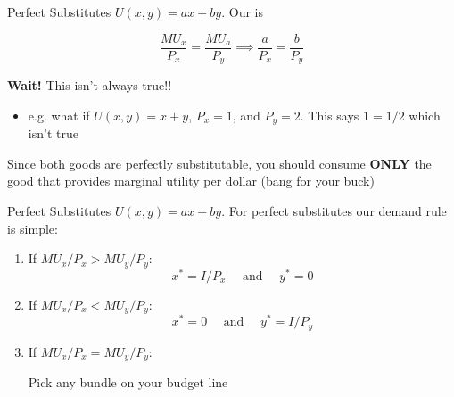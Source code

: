 \documentclass[12pt,t]{beamer}
\begin{document}
\begin{frame}{Perfect Substitutes}
  $U(x,y) = ax + by$. Our  is

  $$
    \frac{MU_x}{P_x} = \frac{MU_a}{P_y} \implies \frac{a}{P_x} = \frac{b}{P_y}
  $$

  \pause\bigskip
  \textbf{Wait!} This isn't always true!!
  \begin{itemize}
    \item e.g. what if $U(x,y) = x + y$, $P_x = 1$, and $P_y = 2$. This says $1 = 1/2$ which isn't true
  \end{itemize} 

  \pause\bigskip
  Since both goods are perfectly substitutable, you should consume \textbf{ONLY} the good that provides marginal utility per dollar (bang for your buck)
\end{frame}

\begin{frame}{Perfect Substitutes}
  $U(x,y) = ax + by$. For perfect substitutes our demand rule is simple: 
  
  \bigskip
  \begin{enumerate}
    \item If $MU_x/P_x > MU_y / P_y$: 
    $$
      x^* = I / P_x \quad\text{ and }\quad y^* = 0
    $$

    \item If $MU_x/P_x < MU_y / P_y$: 
    $$
      x^* = 0 \quad\text{ and }\quad y^* = I / P_y
    $$
    
    \item If $MU_x/P_x = MU_y / P_y$: 
    
    \begin{center}
      Pick any bundle on your budget line 
    \end{center}
  \end{enumerate}
\end{frame}
\end{document}
